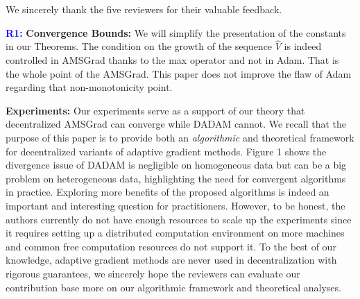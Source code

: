 \documentclass{article}
\begin{document}
We sincerely thank the five reviewers for their valuable feedback.


\vspace{0.01in}

\textbf{\textcolor{blue}{R1:}}
\textbf{Convergence Bounds:} 
We will simplify the presentation of the constants in our Theorems.
The condition on the growth of the sequence $\hat{V}$ is indeed controlled in AMSGrad thanks to the max operator and not in Adam. That is the whole point of the AMSGrad. This paper does not improve the flaw of Adam regarding that non-monotonicity point.

\textbf{Experiments:} 
Our experiments serve as a support of our theory that decentralized AMSGrad can converge while DADAM cannot.
We recall that the purpose of this paper is to provide both an \emph{algorithmic} and {theoretical} framework for decentralized variants of adaptive gradient methods. 
 Figure 1 shows the divergence issue of DADAM is negligible on homogeneous data but can be a big problem on heterogeneous data, highlighting the need for convergent algorithms in practice. 
 Exploring more benefits of the proposed algorithms is indeed an important and interesting question for practitioners. However, to be honest, the authors currently do not have enough  resources to scale up the experiments since it requires setting up a distributed computation environment on more machines and common free computation resources do not support it. 
 To the best of our knowledge, adaptive gradient methods are never used in decentralization with rigorous guarantees, we sincerely hope the reviewers can evaluate our contribution base more on our algorithmic framework and theoretical analyses.
 
\vspace{0.01in}
\end{document}

